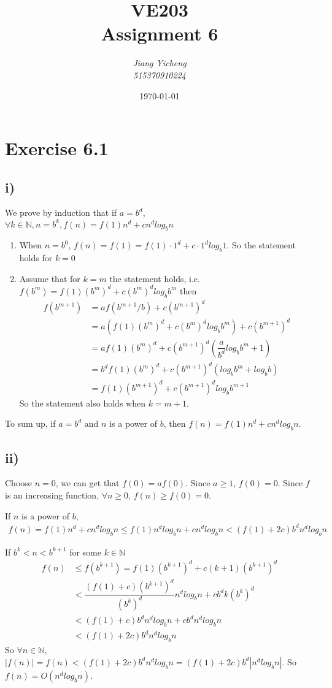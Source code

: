 \documentclass[a4paper,12pt,titlepage]{article}
\author{\textit{Jiang Yicheng}\\\textit{515370910224}}
\title{\textbf{VE203\\
		Assignment 6}}
\date{\today}
\begin{document}
\maketitle

\section*{Exercise 6.1} 
\subsection*{i)}
We prove by induction that if $a=b^d$, $\forall k\in\mathbb{N},n=b^k,f(n)=f(1)n^d+cn^dlog_bn$
\begin{enumerate}
\item When $n=b^0$, $f(n)=f(1)=f(1)\cdot 1^d+c\cdot1^dlog_b1$. So the statement holds for $k=0$
\item Assume that for $k=m$ the statement holds, i.e. $f(b^m)=f(1)(b^m)^d+c(b^m)^dlog_bb^m$
then 
\begin{align*}
f(b^{m+1})&=af(b^{m+1}/b)+c(b^{m+1})^d\\
&=a(f(1)(b^m)^d+c(b^m)^dlog_bb^m)+c(b^{m+1})^d\\
&=af(1)(b^m)^d+c(b^{m+1})^d(\dfrac{a}{b^d}log_bb^m+1)\\
&=b^df(1)(b^m)^d+c(b^{m+1})^d(log_bb^{m}+log_bb)\\
&=f(1)(b^{m+1})^d+c(b^{m+1})^dlog_bb^{m+1}
\end{align*}
So the statement also holds when $k=m+1$.
\end{enumerate}

To sum up, if $a=b^d$ and $n$ is a power of $b$, then $f(n)=f(1)n^d+cn^dlog_bn$.
\subsection*{ii)}
Choose $n=0$, we can get that $f(0)=af(0)$. Since $a\geqslant1$, $f(0)=0$. Since $f$ is an  increasing function, $\forall n\geqslant0$, $f(n)\geqslant f(0)=0.$ 

If $n$ is a power of $b$, 
\begin{align*}
f(n)=f(1)n^d+cn^dlog_bn\leqslant f(1)n^dlog_bn+cn^dlog_bn<(f(1)+2c)b^dn^dlog_bn
\end{align*}

If $b^k<n<b^{k+1}$ for some $k\in\mathbb{N}$
\begin{align*}
f(n)&\leqslant f(b^{k+1})=f(1)(b^{k+1})^d+c(k+1)(b^{k+1})^d\\
&<\dfrac{(f(1)+c)(b^{k+1})^d}{(b^k)^d}n^dlog_bn+cb^dk(b^k)^d\\
&<(f(1)+c)b^dn^dlog_bn+cb^dn^dlog_bn\\
&<(f(1)+2c)b^dn^dlog_bn
\end{align*}
So $\forall n\in\mathbb{N}$, $|f(n)|=f(n)<(f(1)+2c)b^dn^dlog_bn=(f(1)+2c)b^d|n^dlog_bn|$. So $f(n)=O(n^dlog_bn)$.
\end{document}
